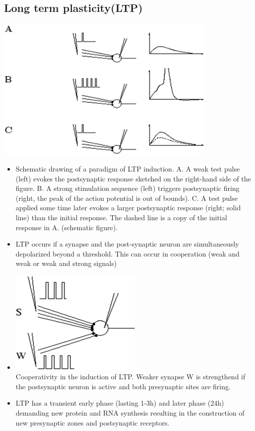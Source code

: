 \documentclass[english,11pt]{article}
\begin{document}
\subsection{Long term plasticity(LTP)}
\includegraphics[width=0.8\textwidth]{LTP.png}
\begin{itemize}
\item Schematic drawing of a paradigm of LTP induction. \subitem A. A weak test pulse (left) evokes the postsynaptic response sketched on the right-hand side of the figure. 
\subitem B. A strong stimulation sequence (left) triggers postsynaptic firing (right, the peak of the action potential is out of bounds). 
\subitem C. A test pulse applied some time later evokes a larger postsynaptic response (right; solid line) than the initial response. The dashed line is a copy of the initial response in A. (schematic figure).
\item LTP occurs if a synapse and the post-synaptic neuron are simultaneously depolarized beyond a threshold. This can occur in cooperation (weak and weak or weak and strong signals)
\item \includegraphics[width=0.5\textwidth]{LTP-coop.png}\\
Cooperativity in the induction of LTP. Weaker synapse W is strengthend if the postsynaptic neuron is active and both presynaptic sites are firing.
\item LTP has a transient early phase (lasting 1-3h) and later phase (24h) demanding new protein and RNA synthesis resulting in the construction of new presynaptic zones and postsynaptic receptors.
\end{itemize}
\end{document}
